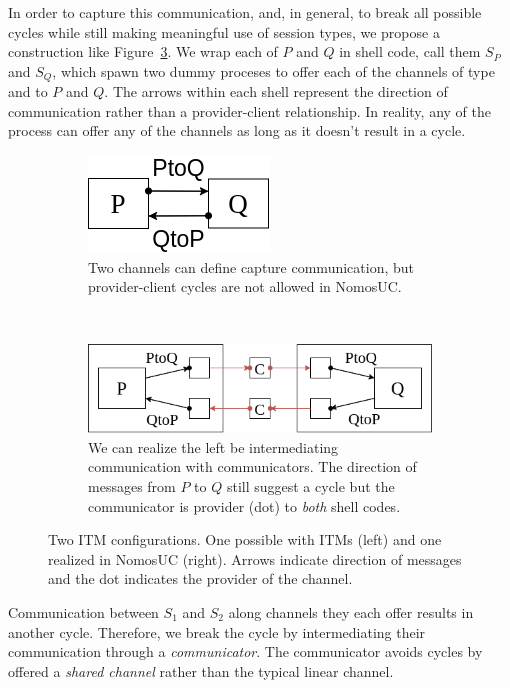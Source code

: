 In order to capture this communication, and, in general, to break all possible cycles while still making meaningful use of session types, we propose a construction like Figure~\ref{fig:newpandq}.
We wrap each of $P$ and $Q$ in shell code, call them $S_P$ and $S_Q$, which spawn two dummy proceses to offer each of the channels of type  and  to $P$ and $Q$.
The arrows within each shell represent the direction of communication rather than a provider-client relationship. 
In reality, any of the process can offer any of the channels as long as it doesn't result in a cycle.
\begin{figure}
	\begin{subfigure}{0.3\textwidth}
	\centering
	\includegraphics[scale=0.4]{figures/p_and_q.png}
	\caption{Two channels can define capture communication, but provider-client cycles are not allowed in NomosUC.}
	\label{fig:pandq}
	\end{subfigure}
	~ \ \ \ \ 
	\begin{subfigure}{0.6\textwidth}
	\centering
	\includegraphics[scale=0.4]{figures/new_p_and_q.png}
	\caption{We can realize the left be intermediating communication with communicators. The direction of messages from $P$ to $Q$ still suggest a cycle but the communicator is provider (dot) to \emph{both} shell codes.}
	\label{fig:newpandq}
	\end{subfigure}
	\caption{Two ITM configurations. One possible with ITMs (left) and one realized in NomosUC (right). Arrows indicate direction of messages and the dot indicates the provider of the channel.}
\end{figure}
Communication between $S_1$ and $S_2$ along channels they each offer results in another cycle. 
Therefore, we break the cycle by intermediating their communication through a \emph{communicator}.
The communicator avoids cycles by offered a \emph{shared channel} rather than the typical linear channel.

